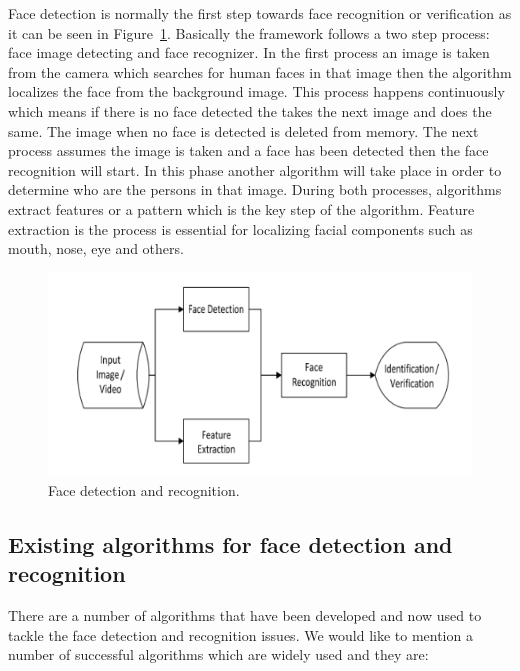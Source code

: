 Face detection is normally the first step towards face recognition or verification as it can be seen in  Figure~\ref{fig:framework}. Basically the framework follows a two step process: face image detecting and face recognizer. In the first process an image is taken from the camera which searches for human faces in that image then the algorithm localizes the face from the background image. This process happens continuously which means if there is no face detected the takes the next image and does the same. The image when no face is detected is deleted from memory. The next process assumes the image is taken and a face has been detected then the face recognition will start. In this phase another algorithm will take place in order to determine who are the persons in that image. During both processes, algorithms extract features or a pattern which is the key step of the algorithm. Feature extraction is the process is essential for localizing facial components such as mouth, nose, eye and others. 

\begin{figure}[!htb]
    \centering
    \includegraphics[width=1\textwidth]{figures/framework.jpg}
    \caption{ Face detection and recognition.}
    \label{fig:framework}
\end{figure}


\subsection{Existing  algorithms  for  face detection and recognition}

There are a number of algorithms that have been developed and now used to tackle the face detection and recognition issues. We would like to mention a number of successful algorithms which are widely used and they are: 

